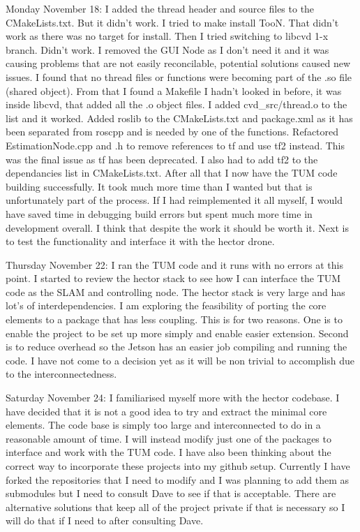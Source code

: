 \documentclass[]{../resources/final_report}
\begin{document}
\begin{appendices}
  Monday November 18: I added the thread header and source files to the CMakeLists.txt. But it didn’t work. I tried to make install TooN. That didn’t work as there was no target for install. Then I tried switching to libcvd 1-x branch. Didn’t work. I removed the GUI Node as I don’t need it and it was causing problems that are not easily reconcilable, potential solutions caused new issues. I found that no thread files or functions were becoming part of the .so file (shared object). From that I found a Makefile I hadn’t looked in before, it was inside libcvd, that added all the .o object files. I added cvd\_src/thread.o to the list and it worked. Added roslib to the CMakeLists.txt and package.xml as it has been separated from roscpp and is needed by one of the functions. Refactored EstimationNode.cpp and .h to remove references to tf and use tf2 instead. This was the final issue as tf has been deprecated. I also had to add tf2 to the dependancies list in CMakeLists.txt. After all that I now have the TUM code building successfully. It took much more time than I wanted but that is unfortunately part of the process. If I had reimplemented it all myself, I would have saved time in debugging build errors but spent much more time in development overall. I think that despite the work it should be worth it. Next is to test the functionality and interface it with the hector drone.
  
  Thursday November 22: I ran the TUM code and it runs with no errors at this point. I started to review the hector stack to see how I can interface the TUM code as the SLAM and controlling node. The hector stack is very large and has lot’s of interdependencies. I am exploring the feasibility of porting the core elements to a package that has less coupling. This is for two reasons. One is to enable the project to be set up more simply and enable easier extension. Second is to reduce overhead so the Jetson has an easier job compiling and running the code. I have not come to a decision yet as it will be non trivial to accomplish due to the interconnectedness.
  
  Saturday November 24: I familiarised myself more with the hector codebase. I have decided that it is not a good idea to try and extract the minimal core elements. The code base is simply too large and interconnected to do in a reasonable amount of time. I will instead modify just one of the packages to interface and work with the TUM code. I have also been thinking about the correct way to incorporate these projects into my github setup. Currently I have forked the repositories that I need to modify and I was planning to add them as submodules but I need to consult Dave to see if that is acceptable. There are alternative solutions that keep all of the project private if that is necessary so I will do that if I need to after consulting Dave.
  

\end{appendices}
\end{document}
